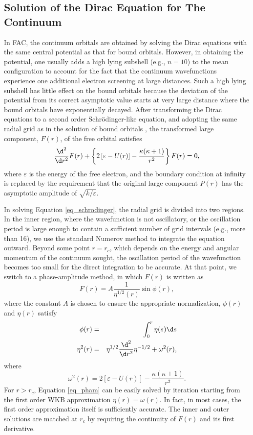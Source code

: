 \documentclass{elsart}
\begin{document}
\subsection{Solution of the Dirac Equation for The Continuum}
In FAC, the continuum orbitals are obtained by solving the Dirac equations
with the same central potential as that for bound orbitals. However, in
obtaining the potential, one usually adds a high lying subshell (e.g., $n
= 10$) to the mean configuration to account for the fact that the continuum
wavefunctions experience one additional electron screening at large
distances. Such a high 
lying subshell has little effect on the bound orbitals because the deviation
of the potential from its correct asymptotic value starts at very large
distance where the bound orbitals have exponentially decayed. After
transforming the Dirac equations to a second order Schr\"{o}dinger-like
equation, and adopting the same radial grid as in the solution of bound
orbitals , the transformed large component, $F(r)$,  of the
free orbital satisfies 
\begin{eqnarray}
\label{eq_schrodinger}
\frac{\d^2}{\d r^2}F(r) + \left\{2\left[\varepsilon-U(r)\right] - 
\frac{\kappa(\kappa + 1)}{r^2}\right\}F(r) = 0,
\end{eqnarray}
where $\varepsilon$ is the energy of the free electron, and the boundary
condition at infinity is replaced by the requirement that the
original large component $P(r)$  has the asymptotic amplitude of
$\sqrt{k/\varepsilon}$.  

In solving Equation \ref{eq_schrodinger}, the radial grid is divided into two
regions. In the inner region, where the wavefunction is not oscillatory, or
the oscillation period is large enough to contain a sufficient number of grid
intervals (e.g., more than 16), we use the standard Numerov method to
integrate the equation outward. Beyond some point $r = r_c$, which depends on
the energy and angular momentum of the continuum sought, the oscillation
period of the wavefunction becomes too small for the direct integration to be
accurate. At that point, we switch to a phase-amplitude method, in which
$F(r)$ is written as
\begin{equation}
F(r) = A\frac{1}{\eta^{1/2}(r)} \sin\phi(r),
\end{equation}
where the constant $A$ is chosen to ensure the appropriate normalization,
$\phi(r)$ and $\eta(r)$ satisfy  
\begin{eqnarray}
\label{eq_pham}
\phi(r) &=& \int_0^{r} \eta(s) \d s \nonumber \\
\eta^2(r) &=& \eta^{1/2}\frac{\d^2}{\d r^2}\eta^{-1/2} + \omega^2(r) ,
\end{eqnarray}
where
\begin{equation}
\omega^2(r) = 2\left[\varepsilon-U(r)\right] - 
\frac{\kappa(\kappa + 1)}{r^2} .
\end{equation}
For $r > r_c$, Equation \ref{eq_pham} can be easily solved by iteration
starting from the first order WKB approximation $\eta(r) = \omega(r)$. In
fact, in most cases, the first order approximation itself is sufficiently
accurate. The inner and outer solutions are matched at $r_c$ by requiring the
continuity of $F(r)$ and its first derivative. 
\end{document}
